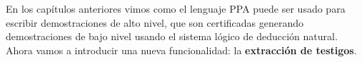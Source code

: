 


\newpage

En los capítulos anteriores vimos como el lenguaje PPA puede ser usado para
escribir demostraciones de alto nivel, que son certificadas generando
demostraciones de bajo nivel usando el sistema lógico de deducción natural.
Ahora vamos a introducir una nueva funcionalidad: la \textbf{extracción de testigos}.

